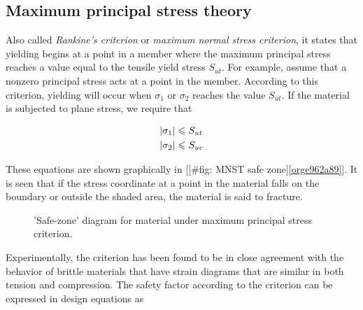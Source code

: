 \documentclass[a4paper,openany,12pt]{book}
\begin{document}
\subsection{Maximum principal stress theory}
\label{sec:orgaa63f82}
Also called \emph{Rankine's criterion} or \emph{maximum normal stress criterion},
it states that yielding begins at a point in a member where the maximum
principal stress reaches a value equal to the tensile yield stress
\(S_{ut}\). For example, assume that a nonzero principal stress acts at a
point in the member. According to this criterion, yielding will occur
when \(\sigma_1\) or \(\sigma_2\) reaches the value \(S_{ut}\). If the
material is subjected to plane stress, we require that

$$\begin{gathered}
    \left| \sigma _1 \right| \leqslant S_{ut} \hfill \\
    \left| \sigma _2 \right| \leqslant S_{uc} \hfill \\ 
  \end{gathered}$$

These equations are shown graphically in
[[\#fig: MNST safe zone]\ref{orge962a89}]. It is seen that if the
stress coordinate at a point in the material falls on the boundary or
outside the shaded area, the material is said to fracture.

\begin{figure}[h]
  \centering
  \caption{'Safe-zone' diagram for material under maximum principal stress criterion.}
  \label{fig: MNST safe zone}
\end{figure}

Experimentally, the criterion has been found to be in close agreement
with the behavior of brittle materials that have strain diagrams that
are similar in both tension and compression. The safety factor according
to the criterion can be expressed in design equations as
\end{document}
